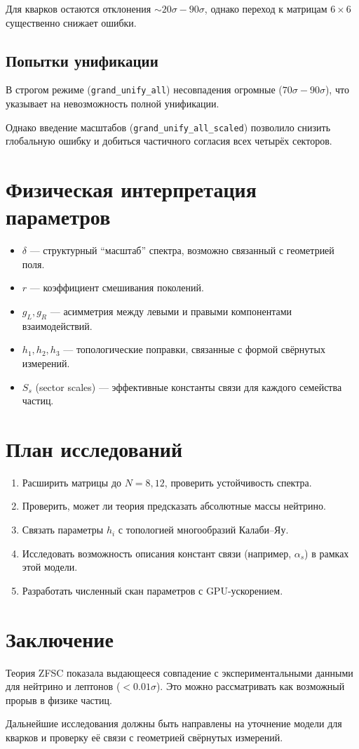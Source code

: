 \documentclass[12pt,a4paper]{article}
\begin{document}
Для кварков остаются отклонения $\sim 20\sigma - 90\sigma$, 
однако переход к матрицам $6\times6$ существенно снижает ошибки.

\subsection{Попытки унификации}
В строгом режиме (\texttt{grand\_unify\_all}) несовпадения огромные 
($70\sigma - 90\sigma$), что указывает на невозможность полной унификации.  

Однако введение масштабов (\texttt{grand\_unify\_all\_scaled}) позволило 
снизить глобальную ошибку и добиться частичного согласия всех четырёх секторов.

\section{Физическая интерпретация параметров}
\begin{itemize}
  \item $\delta$ — структурный ``масштаб'' спектра, возможно связанный с геометрией поля.  
  \item $r$ — коэффициент смешивания поколений.  
  \item $g_L, g_R$ — асимметрия между левыми и правыми компонентами взаимодействий.  
  \item $h_1, h_2, h_3$ — топологические поправки, связанные с формой свёрнутых измерений.  
  \item $S_s$ (sector scales) — эффективные константы связи для каждого семейства частиц.  
\end{itemize}

\section{План исследований}
\begin{enumerate}
  \item Расширить матрицы до $N=8,12$, проверить устойчивость спектра.  
  \item Проверить, может ли теория предсказать абсолютные массы нейтрино.  
  \item Связать параметры $h_i$ с топологией многообразий Калаби--Яу.  
  \item Исследовать возможность описания констант связи (например, $\alpha_s$) в рамках этой модели.  
  \item Разработать численный скан параметров с GPU-ускорением.  
\end{enumerate}

\section{Заключение}
Теория ZFSC показала выдающееся совпадение с экспериментальными данными 
для нейтрино и лептонов ($<0.01\sigma$).  
Это можно рассматривать как возможный прорыв в физике частиц.  

Дальнейшие исследования должны быть направлены на уточнение модели для кварков 
и проверку её связи с геометрией свёрнутых измерений.  
\end{document}
